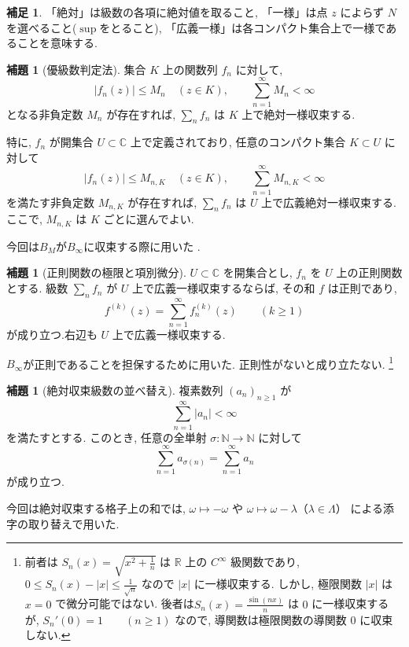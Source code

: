 \documentclass[dvipdfmx,a4paper,11pt]{article} %
\newcommand{\R}{\mathbb{R}}
\newcommand{\C}{\mathbb{C}}
\theoremstyle{definition}
\numberwithin{equation}{section}
\newtheorem{lem}[thm]{補題}
\newtheorem{rem}[thm]{補足}
\begin{document}
\begin{rem}
「絶対」は級数の各項に絶対値を取ること, 
「一様」は点 $z$ によらず $N$ を選べること($\sup$をとること), 
「広義一様」は各コンパクト集合上で一様であることを意味する.
\end{rem}



\begin{lem}[優級数判定法]\label{thm-weierstrass-M}
集合 $K$ 上の関数列 $f_n$ に対して, 
\[
|f_n(z)|\leq M_n\quad(z\in K),\qquad
\sum_{n=1}^{\infty}M_n<\infty
\]
となる非負定数 $M_n$ が存在すれば, 
$\sum_n f_n$ は $K$ 上で絶対一様収束する.

特に, $f_n$ が開集合 $U\subset\C$ 上で定義されており, 
任意のコンパクト集合 $K\subset U$ に対して
\[
|f_n(z)|\leq M_{n,K}\quad(z\in K),\qquad
\sum_{n=1}^{\infty}M_{n,K}<\infty
\]
を満たす非負定数 $M_{n,K}$ が存在すれば, 
$\sum_n f_n$ は $U$ 上で広義絶対一様収束する.
ここで, $M_{n,K}$ は $K$ ごとに選んでよい.
\end{lem}
今回は$B_{M}$が$B_\infty$に収束する際に用いた .


\begin{lem}[正則関数の極限と項別微分]\label{thm-holomorphic-limit}
$U\subset\C$ を開集合とし, $f_n$ を $U$ 上の正則関数とする.
級数 $\sum_n f_n$ が $U$ 上で広義一様収束するならば, 
その和 $f$ は正則であり, 
\[
f^{(k)}(z)=\sum_{n=1}^{\infty}f_n^{(k)}(z)
\qquad(k\geq1)
\]
が成り立つ.右辺も $U$ 上で広義一様収束する.
\end{lem}
$B_\infty$が正則であることを担保するために用いた. 
正則性がないと成り立たない. \footnote{前者は
\(
S_n(x)=\sqrt{x^2+\frac1n}
\)
は $\R$ 上の $C^\infty$ 級関数であり, 
\(
0\leq S_n(x)-|x|\leq\frac1{\sqrt n}
\)
なので $|x|$ に一様収束する.
しかし, 極限関数 $|x|$ は $x=0$ で微分可能ではない.
後者は\(
S_n(x)=\frac{\sin(nx)}{n}
\)
は $0$ に一様収束するが, 
\(
S_n'(0)=1\qquad(n\geq1)
\)
なので, 導関数は極限関数の導関数 $0$ に収束しない.
}

\begin{lem}[絶対収束級数の並べ替え]\label{lem-absolute-rearrangement}
複素数列 $(a_n)_{n\geq1}$ が
\[
\sum_{n=1}^{\infty}|a_n|<\infty
\]
を満たすとする.
このとき, 任意の全単射 $\sigma:\mathbb N\to\mathbb N$ に対して
\[
\sum_{n=1}^{\infty}a_{\sigma(n)}
=\sum_{n=1}^{\infty}a_n
\]
が成り立つ.
\end{lem}
今回は絶対収束する格子上の和では, 
$\omega\mapsto-\omega$ や
$\omega\mapsto\omega-\lambda$（$\lambda\in\Lambda$）
による添字の取り替えで用いた.
\end{document}
